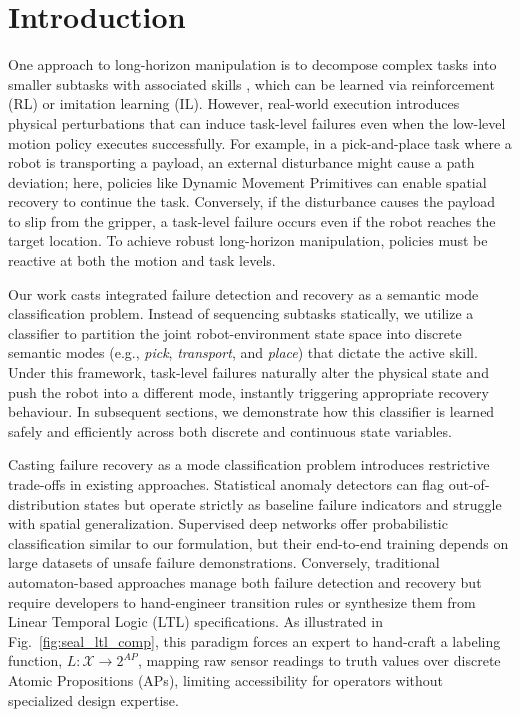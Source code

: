 \documentclass[journal]{IEEEtran}
\begin{document}
\section{Introduction}
One approach to long-horizon manipulation is to decompose complex tasks into smaller subtasks with associated skills \cite{dalal2024manipgen,Ahn2022DoAI,wu2023tidybot,huang2022inner,merging_dmp}, which can be learned via reinforcement (RL) or imitation learning (IL). However, real-world execution introduces physical perturbations that can induce task-level failures even when the low-level motion policy executes successfully. For example, in a pick-and-place task where a robot is transporting a payload, an external disturbance might cause a path deviation; here, policies like Dynamic Movement Primitives \cite{Ijspeert_NC_2013} can enable spatial recovery to continue the task. Conversely, if the disturbance causes the payload to slip from the gripper, a task-level failure occurs even if the robot reaches the target location. To achieve robust long-horizon manipulation, policies must be reactive at both the motion and task levels.

Our work casts integrated failure detection and recovery as a semantic mode classification problem. Instead of sequencing subtasks statically, we utilize a classifier to partition the joint robot-environment state space into discrete semantic modes (e.g., \textit{pick}, \textit{transport}, and \textit{place}) that dictate the active skill. Under this framework, task-level failures naturally alter the physical state and push the robot into a different mode, instantly triggering appropriate recovery behaviour. In subsequent sections, we demonstrate how this classifier is learned safely and efficiently across both discrete and continuous state variables.

Casting failure recovery as a mode classification problem introduces restrictive trade-offs in existing approaches. Statistical anomaly detectors can flag out-of-distribution states but operate strictly as baseline failure indicators and struggle with spatial generalization. Supervised deep networks offer probabilistic classification similar to our formulation, but their end-to-end training depends on large datasets of unsafe failure demonstrations. Conversely, traditional automaton-based approaches manage both failure detection and recovery but require developers to hand-engineer transition rules or synthesize them from Linear Temporal Logic (LTL) specifications. As illustrated in Fig.~\ref{fig:seal_ltl_comp}, this paradigm forces an expert to hand-craft a labeling function, $L: \mathcal{X} \rightarrow 2^{AP}$, mapping raw sensor readings to truth values over discrete Atomic Propositions (APs), limiting accessibility for operators without specialized design expertise. 
\end{document}
